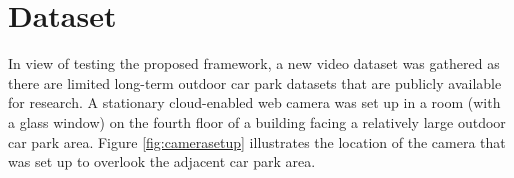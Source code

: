 

\section{Dataset}
\label{section:dataset_used}

In view of testing the proposed framework, a new video dataset was gathered as there are limited long-term outdoor car park datasets that are publicly available for research. A stationary cloud-enabled web camera was set up in a room (with a glass window) on the fourth floor of a building facing a relatively large outdoor car park area. Figure \ref{fig:camerasetup} illustrates the location of the camera that was set up to overlook the adjacent car park area. 

